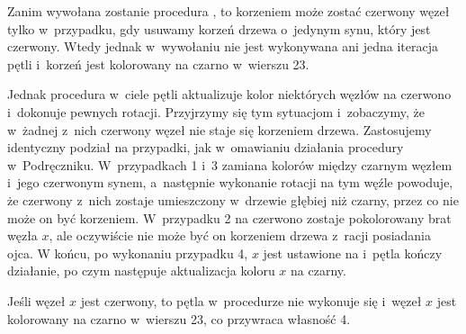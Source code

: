 \bignegskip

\exercise %
Zanim wywołana zostanie procedura , to korzeniem może zostać czerwony węzeł tylko w~przypadku, gdy usuwamy korzeń drzewa o~jedynym synu, który jest czerwony.
Wtedy jednak w~wywołaniu  nie jest wykonywana ani jedna iteracja pętli  i~korzeń jest kolorowany na czarno w~wierszu 23.

Jednak procedura  w~ciele pętli aktualizuje kolor niektórych węzłów na czerwono i~dokonuje pewnych rotacji.
Przyjrzymy się tym sytuacjom i~zobaczymy, że w~żadnej z~nich czerwony węzeł nie staje się korzeniem drzewa.
Zastosujemy identyczny podział na przypadki, jak w~omawianiu działania procedury w~Podręczniku.
W~przypadkach 1 i~3 zamiana kolorów między czarnym węzłem i~jego czerwonym synem, a~następnie wykonanie rotacji na tym węźle powoduje, że czerwony z~nich zostaje umieszczony w~drzewie głębiej niż czarny, przez co nie może on być korzeniem.
W~przypadku 2 na czerwono zostaje pokolorowany brat węzła $x$, ale oczywiście nie może być on korzeniem drzewa z~racji posiadania ojca.
W końcu, po wykonaniu przypadku 4, $x$ jest ustawione na  i~pętla kończy działanie, po czym następuje aktualizacja koloru $x$ na czarny.

\exercise %
Jeśli węzeł $x$ jest czerwony, to pętla  w~procedurze  nie wykonuje się i~węzeł $x$ jest kolorowany na czarno w~wierszu 23, co przywraca własność 4.

